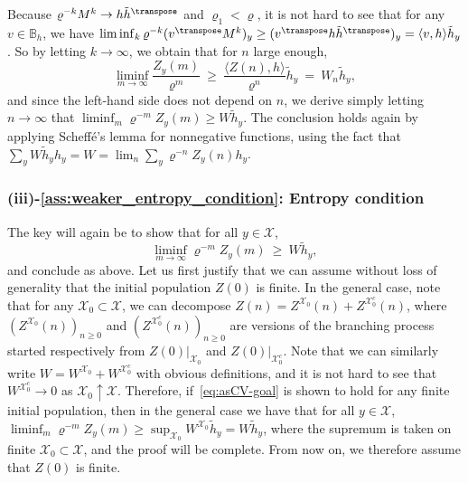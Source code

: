 \begin{refsegment}
\[\]
Because $\varrho^{-k}M^k\to h\tilde{h}^\transpose$ and $\varrho_1<\varrho$, it is not hard to see that for any $v\in \mathbb{B}_h$, we have $\liminf_k\varrho^{-k}(v^\transpose M^k)_y \geq (v^\transpose  h \tilde h^\transpose )_y = \langle v,h\rangle  \tilde{h}_y$.
So by letting $k\to \infty$, we obtain that for $n$ large enough, 
\[
  \liminf_{m\to \infty}\frac{Z_y(m)}{\varrho^{m}}\ \geq\  \frac{\langle Z(n),h\rangle}{\varrho^n} \tilde{h}_y\ =\ W_n\tilde{h}_y,
\]
and since the left-hand side does not depend on $n$, we derive simply letting $n\to\infty$ that $\liminf_{m}\varrho^{-m}Z_y(m) \geq W\tilde{h}_y$. The conclusion holds again by applying Scheffé's lemma for nonnegative functions, using the fact that $\sum_yW\tilde{h}_yh_y = W = \lim_n \sum_y \varrho^{-n}Z_y(n)h_y$.

\subsubsection*{(iii)-\ref{ass:weaker_entropy_condition}: Entropy condition}
The key will again be to show that for all $y\in \mathcal{X}$,
\begin{equation}\label{eq:asCV-goal}
  \liminf_{m\to \infty}\varrho^{-m}Z_y(m)\ \geq\ W\tilde{h}_y,
\end{equation}
and conclude as above.
Let us first justify that we can assume without loss of generality that the initial population $Z(0)$ is finite.
In the general case, note that for any $\mathcal{X}_0\subset \mathcal{X}$, we can decompose $Z(n)=Z^{\mathcal{X}_0}(n)+Z^{\mathcal{X}_0^c}(n)$, where $(Z^{\mathcal{X}_0}(n))_{n\geq 0}$ and $(Z^{\mathcal{X}_0^c}(n))_{n\geq 0}$ are versions of the branching process started respectively from $Z(0)|_{\mathcal{X}_0}$ and $Z(0)|_{\mathcal{X}^c_0}$.
Note that we can similarly write $W=W^{\mathcal{X}_0}+W^{\mathcal{X}_0^c}$ with obvious definitions, and it is not hard to see that $W^{\mathcal{X}_0^c}\to 0$ as $\mathcal{X}_0\uparrow \mathcal{X}$.
Therefore, if~\eqref{eq:asCV-goal} is shown to hold for any finite initial population, then in the general case we have that for all $y\in\mathcal{X}$, $\liminf_{m}\varrho^{-m}Z_y(m) \geq \sup_{\mathcal{X}_0}W^{\mathcal{X}_0}\tilde{h}_y = W\tilde{h}_y$, where the supremum is taken on finite $\mathcal{X}_0\subset \mathcal{X}$, and the proof will be complete.
From now on, we therefore assume that $Z(0)$ is finite.


\end{refsegment}
